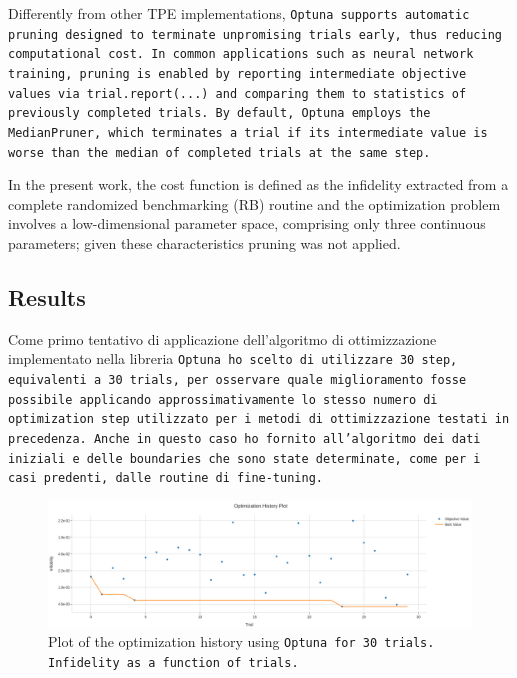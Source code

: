 Differently from other TPE implementations, \tt{Optuna} supports automatic pruning designed to terminate unpromising trials early, thus reducing computational cost. 
In common applications such as neural network training, pruning is enabled by reporting intermediate objective values via \texttt{trial.report(...)} and comparing them to statistics of previously completed trials. 
By default, \texttt{Optuna} employs the \texttt{MedianPruner}, which terminates a trial if its intermediate value is worse than the median of completed trials at the same step.

In the present work, the cost function is defined as the infidelity extracted from a complete randomized benchmarking (RB) routine and the optimization problem involves a low-dimensional parameter space, comprising only three continuous parameters; given these characteristics pruning was not applied.

\subsection{Results}

Come primo tentativo di applicazione dell'algoritmo di ottimizzazione implementato nella libreria \tt{Optuna} ho scelto di utilizzare 30 step, equivalenti a 30 trials, per osservare quale miglioramento fosse possibile applicando approssimativamente lo stesso numero di optimization step utilizzato per i metodi di ottimizzazione testati in precedenza.
Anche in questo caso ho fornito all'algoritmo dei dati iniziali e delle boundaries che sono state determinate, come per i casi predenti, dalle routine di fine-tuning.

\begin{figure}[h!]
    \centering
    \includegraphics[width=\textwidth]{figures/png/RB_optimization/Optuna/30/optimization.png}
    \caption{Plot of the optimization history using \tt{Optuna} for 30 trials. Infidelity as a function of trials.}
    \label{fig:optuna30:optimization}
\end{figure}

